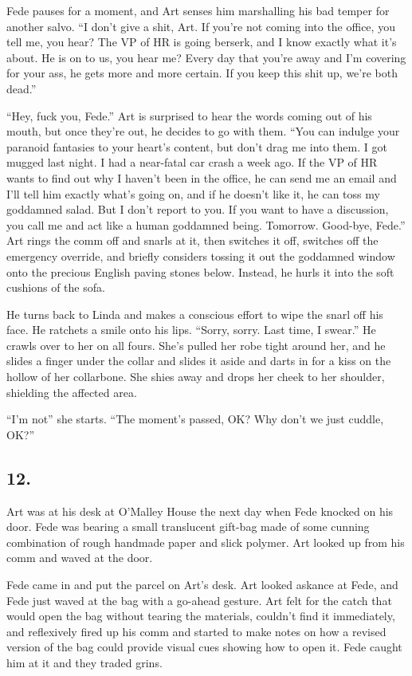 Fede pauses for a moment, and Art senses him marshalling his bad
temper for another salvo. “I don’t give a shit, Art. If you’re not
coming into the office, you tell me, you hear? The VP of HR is
going berserk, and I know exactly what it’s about. He is on to us,
you hear me? Every day that you’re away and I’m covering for your
ass, he gets more and more certain. If you keep this shit up, we’re
both dead.”

“Hey, fuck you, Fede.” Art is surprised to hear the words coming
out of his mouth, but once they’re out, he decides to go with them.
“You can indulge your paranoid fantasies to your heart’s content,
but don’t drag me into them. I got mugged last night. I had a
near-fatal car crash a week ago. If the VP of HR wants to find out
why I haven’t been in the office, he can send me an email and I’ll
tell him exactly what’s going on, and if he doesn’t like it, he can
toss my goddamned salad. But I don’t report to you. If you want to
have a discussion, you call me and act like a human goddamned
being. Tomorrow. Good-bye, Fede.” Art rings the comm off and snarls
at it, then switches it off, switches off the emergency override,
and briefly considers tossing it out the goddamned window onto the
precious English paving stones below. Instead, he hurls it into the
soft cushions of the sofa.

He turns back to Linda and makes a conscious effort to wipe the
snarl off his face. He ratchets a smile onto his lips. “Sorry,
sorry. Last time, I swear.” He crawls over to her on all fours.
She’s pulled her robe tight around her, and he slides a finger
under the collar and slides it aside and darts in for a kiss on the
hollow of her collarbone. She shies away and drops her cheek to her
shoulder, shielding the affected area.

“I’m not{\dash}” she starts. “The moment’s passed, OK? Why don’t we just
cuddle, OK?”

\subsection{12.}

Art was at his desk at O’Malley House the next day when Fede
knocked on his door. Fede was bearing a small translucent gift-bag
made of some cunning combination of rough handmade paper and slick
polymer. Art looked up from his comm and waved at the door.

Fede came in and put the parcel on Art’s desk. Art looked askance
at Fede, and Fede just waved at the bag with a go-ahead gesture.
Art felt for the catch that would open the bag without tearing the
materials, couldn’t find it immediately, and reflexively fired up
his comm and started to make notes on how a revised version of the
bag could provide visual cues showing how to open it. Fede caught
him at it and they traded grins.

